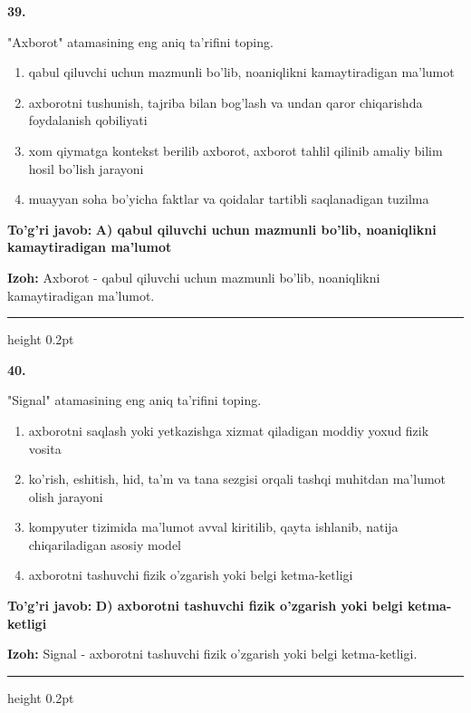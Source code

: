 \documentclass[10pt,a4paper,oneside]{article}
\begin{document}
\noindent\textbf{\color{ink}39.}
\par
"Axborot" atamasining eng aniq ta'rifini toping.
\begin{enumerate}[label=\Alph*),leftmargin=9mm]
\item qabul qiluvchi uchun mazmunli bo'lib, noaniqlikni kamaytiradigan ma'lumot
\item axborotni tushunish, tajriba bilan bog'lash va undan qaror chiqarishda foydalanish qobiliyati
\item xom qiymatga kontekst berilib axborot, axborot tahlil qilinib amaliy bilim hosil bo'lish jarayoni
\item muayyan soha bo'yicha faktlar va qoidalar tartibli saqlanadigan tuzilma
\end{enumerate}
\begin{tcolorbox}[enhanced,breakable,colback=teal!4,colframe=teal!50!black,boxrule=0.5pt,arc=1.1mm,left=3mm,right=3mm,top=1.7mm,bottom=1.7mm,before skip=2mm,after skip=2mm]
\textbf{\color{teal}To'g'ri javob:} \textbf{A) qabul qiluvchi uchun mazmunli bo'lib, noaniqlikni kamaytiradigan ma'lumot}
\par\smallskip
\textbf{Izoh:} Axborot - qabul qiluvchi uchun mazmunli bo'lib, noaniqlikni kamaytiradigan ma'lumot.
\end{tcolorbox}
\vspace{2mm}\hrule height 0.2pt \vspace{3mm}

\noindent\textbf{\color{ink}40.}
\par
"Signal" atamasining eng aniq ta'rifini toping.
\begin{enumerate}[label=\Alph*),leftmargin=9mm]
\item axborotni saqlash yoki yetkazishga xizmat qiladigan moddiy yoxud fizik vosita
\item ko'rish, eshitish, hid, ta'm va tana sezgisi orqali tashqi muhitdan ma'lumot olish jarayoni
\item kompyuter tizimida ma'lumot avval kiritilib, qayta ishlanib, natija chiqariladigan asosiy model
\item axborotni tashuvchi fizik o'zgarish yoki belgi ketma-ketligi
\end{enumerate}
\begin{tcolorbox}[enhanced,breakable,colback=teal!4,colframe=teal!50!black,boxrule=0.5pt,arc=1.1mm,left=3mm,right=3mm,top=1.7mm,bottom=1.7mm,before skip=2mm,after skip=2mm]
\textbf{\color{teal}To'g'ri javob:} \textbf{D) axborotni tashuvchi fizik o'zgarish yoki belgi ketma-ketligi}
\par\smallskip
\textbf{Izoh:} Signal - axborotni tashuvchi fizik o'zgarish yoki belgi ketma-ketligi.
\end{tcolorbox}
\vspace{2mm}\hrule height 0.2pt \vspace{3mm}
\end{document}
